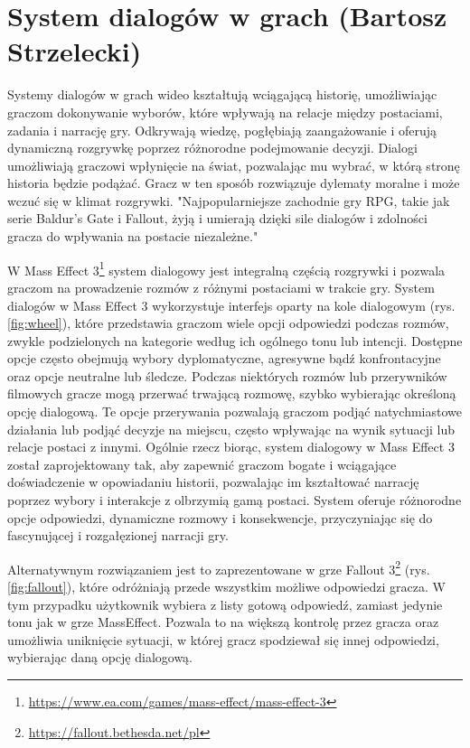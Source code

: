 \section{System dialogów w grach (Bartosz Strzelecki)}\label{chap:dialogi}
Systemy dialogów w grach wideo kształtują wciągającą historię, umożliwiając graczom dokonywanie wyborów, które wpływają na relacje między postaciami, zadania i narrację gry. 
Odkrywają wiedzę, pogłębiają zaangażowanie i oferują dynamiczną rozgrywkę poprzez różnorodne podejmowanie decyzji.
Dialogi umożliwiają graczowi wpłynięcie na świat, pozwalając mu wybrać, w którą stronę historia będzie podążać.
Gracz w ten sposób rozwiązuje dylematy moralne i może wczuć się w klimat rozgrywki.
"Najpopularniejsze zachodnie gry RPG, takie jak serie Baldur's Gate i Fallout, żyją i umierają dzięki sile dialogów i zdolności gracza do wpływania na postacie niezależne."\cite{dialogue}

W Mass Effect 3\footnote{\url{https://www.ea.com/games/mass-effect/mass-effect-3}} system dialogowy jest integralną częścią rozgrywki i pozwala graczom na prowadzenie rozmów z różnymi postaciami w trakcie gry.
System dialogów w Mass Effect 3 wykorzystuje interfejs oparty na kole dialogowym (rys. \ref{fig:wheel}), które
przedstawia graczom wiele opcji odpowiedzi podczas rozmów, zwykle podzielonych na kategorie według ich ogólnego tonu lub intencji.
Dostępne opcje często obejmują wybory dyplomatyczne, agresywne bądź konfrontacyjne oraz opcje neutralne lub śledcze.
Podczas niektórych rozmów lub przerywników filmowych gracze mogą przerwać trwającą rozmowę, szybko wybierając określoną opcję dialogową.
Te opcje przerywania pozwalają graczom podjąć natychmiastowe działania lub podjąć decyzje na miejscu, często wpływając na wynik sytuacji lub relacje postaci z innymi.
Ogólnie rzecz biorąc, system dialogowy w Mass Effect 3 został zaprojektowany tak, aby zapewnić graczom bogate i wciągające doświadczenie w opowiadaniu historii,
pozwalając im kształtować narrację poprzez wybory i interakcje z olbrzymią gamą postaci. System oferuje różnorodne opcje odpowiedzi, dynamiczne rozmowy i konsekwencje,
przyczyniając się do fascynującej i rozgałęzionej narracji gry.

Alternatywnym rozwiązaniem jest to zaprezentowane w grze Fallout 3\footnote{\url{https://fallout.bethesda.net/pl}} (rys. \ref{fig:fallout}), które odróżniają przede wszystkim możliwe odpowiedzi gracza.
W tym przypadku użytkownik wybiera z listy gotową odpowiedź, zamiast jedynie tonu jak w grze MassEffect. Pozwala to na większą kontrolę
przez gracza oraz umożliwia uniknięcie sytuacji, w której gracz spodziewał się innej odpowiedzi, wybierając daną opcję dialogową.

